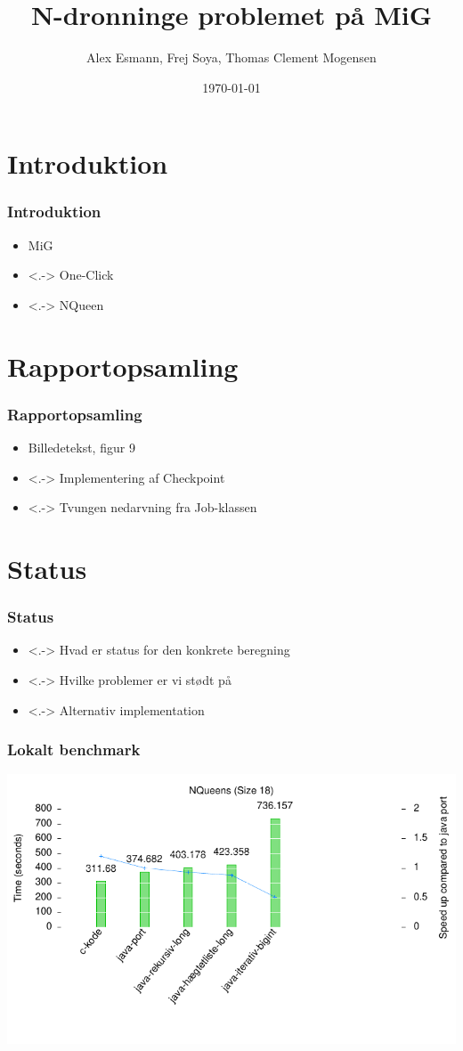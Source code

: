 \documentclass{beamer}
\title{N-dronninge problemet på MiG}
\author{Alex Esmann, Frej Soya, Thomas Clement Mogensen}
\date{\today}
\begin{document}
\frame{\titlepage}
\section{Introduktion}
\frame
{
	\frametitle{Introduktion}

	\begin{itemize}
	\item<1-> MiG
	\item<.-> One-Click
	\item<.-> NQueen
	\end{itemize}
}


\section{Rapportopsamling}
\frame
{
  \frametitle{Rapportopsamling}

  \begin{itemize}
  \item<1-> Billedetekst, figur 9
  \item<.-> Implementering af Checkpoint 
  \item<.-> Tvungen nedarvning fra Job-klassen
  \end{itemize}
}

\section{Status}
\frame
{
  \frametitle{Status}

  \begin{itemize}
  \item<.-> Hvad er status for den konkrete beregning
  \item<.-> Hvilke problemer er vi stødt på
  \item<.-> Alternativ implementation

  \end{itemize}
  
  
}

\frame
{
  \frametitle{Lokalt benchmark}
  \includegraphics{../benchmarks/lokal2.pdf}   
  
}
\end{document}

